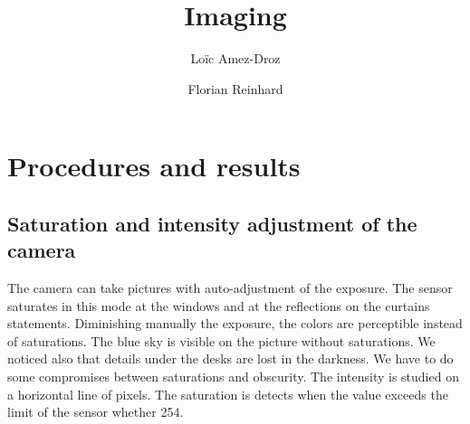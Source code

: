 \documentclass[a4paper, 12pt]{paper}
\author{Loïc Amez-Droz \and Florian Reinhard}
\title{Imaging}
\begin{document}

\section{Procedures and results}
\subsection{Saturation and intensity adjustment of the camera}

The camera can take pictures with auto-adjustment of the exposure.
The sensor saturates in this mode at the windows and at the reflections on the curtains statements.
Diminishing manually the exposure, the colors are perceptible instead of saturations.
The blue sky is visible on the picture without saturations.
We noticed also that details under the desks are lost in the darkness.
We have to do some compromises between saturations and obscurity.
The intensity is studied on a horizontal line of pixels.
The saturation is detects when the value exceeds the limit of the sensor whether 254.
\end{document}
